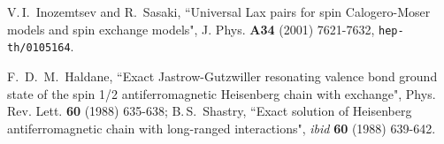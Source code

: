 \documentclass[a4paper,12pt]{article}
\begin{document}
\begin{thebibliography}{99}
V.\,I.~Inozemtsev and R.~Sasaki,
``Universal Lax pairs for spin Calogero-Moser models and spin
exchange models",
J. Phys. {\bf A34} (2001) 7621-7632, {\tt hep-th/0105164}.

F.\, D.\, M.~Haldane,
``Exact Jastrow-Gutzwiller resonating valence bond ground state of
the spin 1/2 antiferromagnetic Heisenberg chain with \coordHE{} exchange",
Phys. Rev. Lett. {\bf 60} (1988) 635-638;
B.\,S.~Shastry,
``Exact solution of \coordHE{} Heisenberg antiferromagnetic chain with
long-ranged interactions",
{\it ibid} {\bf 60} (1988) 639-642.

\end{thebibliography}
\end{document}
